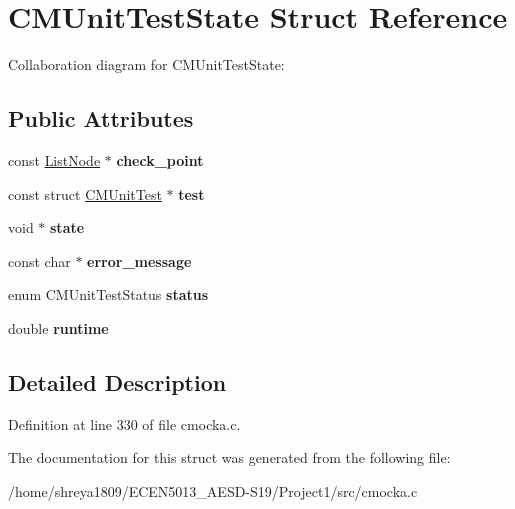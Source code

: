 \hypertarget{structCMUnitTestState}{}\section{C\+M\+Unit\+Test\+State Struct Reference}
\label{structCMUnitTestState}


Collaboration diagram for C\+M\+Unit\+Test\+State\+:
\subsection*{Public Attributes}
\begin{DoxyCompactItemize}
\item 
\mbox{\label{structCMUnitTestState_ad769ff44848de44f80c93d61a7eddb17}} 
const \hyperlink{structListNode}{List\+Node} $\ast$ {\bfseries check\+\_\+point}
\item 
\mbox{\label{structCMUnitTestState_abf83fd798716db84ada52946bf11cf4c}} 
const struct \hyperlink{structCMUnitTest}{C\+M\+Unit\+Test} $\ast$ {\bfseries test}
\item 
\mbox{\label{structCMUnitTestState_ad923f78d81da599c113295cd33a9e959}} 
void $\ast$ {\bfseries state}
\item 
\mbox{\label{structCMUnitTestState_a9649fbe018ad0be988e4e17fb42f9d7f}} 
const char $\ast$ {\bfseries error\+\_\+message}
\item 
\mbox{\label{structCMUnitTestState_a669ce36dac14c0cc9380e336382fe415}} 
enum C\+M\+Unit\+Test\+Status {\bfseries status}
\item 
\mbox{\label{structCMUnitTestState_a9e6b7af92cff16f613c0d89022bb20de}} 
double {\bfseries runtime}
\end{DoxyCompactItemize}


\subsection{Detailed Description}


Definition at line 330 of file cmocka.\+c.



The documentation for this struct was generated from the following file\+:\begin{DoxyCompactItemize}
\item 
/home/shreya1809/\+E\+C\+E\+N5013\+\_\+\+A\+E\+S\+D-\/\+S19/\+Project1/src/cmocka.\+c\end{DoxyCompactItemize}
